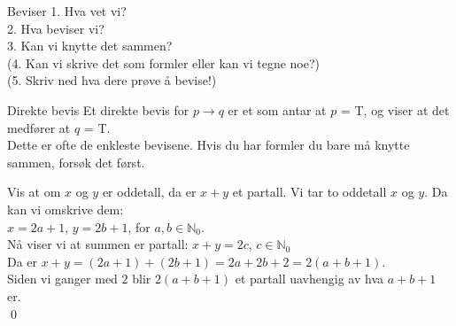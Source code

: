 

\begin{frame}{Beviser}
    1. Hva vet vi?\\
    
    2. Hva beviser vi? \\
    
    3. Kan vi knytte det sammen?\\
    
    (4. Kan vi skrive det som formler eller kan vi tegne noe?)\\

    (5. Skriv ned hva dere prøve å bevise!) %
\end{frame}


\begin{frame}{Direkte bevis}
    Et direkte bevis for $p \rightarrow q$ er et som antar at $p$ = T, og viser at det medfører at $q$ = T.\\
    Dette er ofte de enkleste bevisene. Hvis du har formler du bare må knytte sammen, forsøk det først.\\
    
    \pause
    \begin{block}{Vis at om $x$ og $y$ er oddetall, da er $x + y$ et partall.}
        Vi tar to oddetall $x$ og $y$. Da kan vi omskrive dem:\\
        $x = 2a+1$, $y = 2b+1$, for $a, b \in \mathbb{N}_0$.\\
        Nå viser vi at summen er partall: $x+y=2c$, $c \in \mathbb{N}_0$\\
        Da er $x + y = (2a+1) + (2b+1) = 2a + 2b + 2 = 2(a+b+1)$.\\
        Siden vi ganger med $2$ blir $2(a + b + 1)$ et partall uavhengig av hva $a + b + 1$ er.\\
        \qed
    \end{block}
\end{frame}

